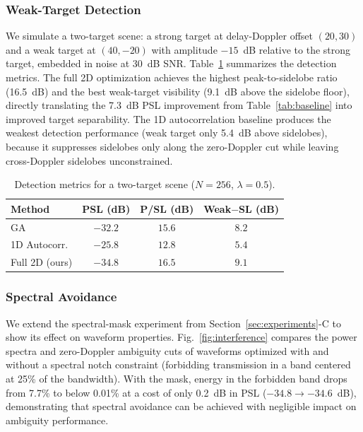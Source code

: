 \documentclass[journal]{IEEEtran}
\begin{document}
\subsubsection{Weak-Target Detection}

We simulate a two-target scene: a strong target at delay-Doppler offset $(20, 30)$ and a weak target at $(40, -20)$ with amplitude $-15$~dB relative to the strong target, embedded in noise at 30~dB SNR.
Table~\ref{tab:detection} summarizes the detection metrics.
The full 2D optimization achieves the highest peak-to-sidelobe ratio (16.5~dB) and the best weak-target visibility (9.1~dB above the sidelobe floor), directly translating the 7.3~dB PSL improvement from Table~\ref{tab:baseline} into improved target separability.
The 1D autocorrelation baseline produces the weakest detection performance (weak target only 5.4~dB above sidelobes), because it suppresses sidelobes only along the zero-Doppler cut while leaving cross-Doppler sidelobes unconstrained.

\begin{table}[!htbp]
\centering
\caption{Detection metrics for a two-target scene ($N=256$, $\lambda=0.5$).}
\label{tab:detection}
\renewcommand{\arraystretch}{1.1}
\begin{tabular}{@{}lccc@{}}
\toprule
\textbf{Method} & \textbf{PSL (dB)} & \textbf{P/SL (dB)} & \textbf{Weak$-$SL (dB)} \\
\midrule
GA                & $-32.2$ & $15.6$ & $8.2$ \\
1D Autocorr.      & $-25.8$ & $12.8$ & $5.4$ \\
Full 2D (ours)    & $-34.8$ & $16.5$ & $9.1$ \\
\bottomrule
\end{tabular}
\end{table}

\subsubsection{Spectral Avoidance}

We extend the spectral-mask experiment from Section~\ref{sec:experiments}-C to show its effect on waveform properties.
Fig.~\ref{fig:interference} compares the power spectra and zero-Doppler ambiguity cuts of waveforms optimized with and without a spectral notch constraint (forbidding transmission in a band centered at 25\% of the bandwidth).
With the mask, energy in the forbidden band drops from 7.7\% to below 0.01\% at a cost of only 0.2~dB in PSL ($-34.8 \rightarrow -34.6$~dB), demonstrating that spectral avoidance can be achieved with negligible impact on ambiguity performance.
\end{document}
